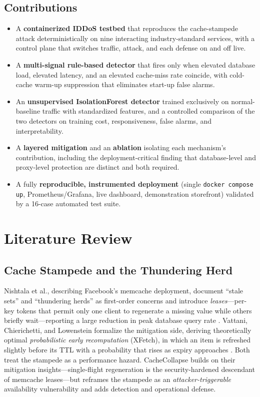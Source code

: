 \documentclass[conference]{IEEEtran}
\begin{document}
\subsection{Contributions}
\begin{itemize}
\item A \textbf{containerized IDDoS testbed} that reproduces the cache-stampede attack
deterministically on nine interacting industry-standard services, with a control
plane that switches traffic, attack, and each defense on and off live.
\item A \textbf{multi-signal rule-based detector} that fires only when elevated
database load, elevated latency, and an elevated cache-miss rate coincide, with
cold-cache warm-up suppression that eliminates start-up false alarms.
\item An \textbf{unsupervised IsolationForest detector} trained exclusively on
normal-baseline traffic with standardized features, and a controlled comparison of
the two detectors on training cost, responsiveness, false alarms, and
interpretability.
\item A \textbf{layered mitigation} and an \textbf{ablation} isolating each
mechanism's contribution, including the deployment-critical finding that
database-level and proxy-level protection are distinct and both required.
\item A fully \textbf{reproducible, instrumented deployment} (single
\texttt{docker compose up}, Prometheus/Grafana, live dashboard, demonstration
storefront) validated by a 16-case automated test suite.
\end{itemize}

\section{Literature Review}
\subsection{Cache Stampede and the Thundering Herd}
Nishtala et al., describing Facebook's memcache deployment, document ``stale sets''
and ``thundering herds'' as first-order concerns and introduce \emph{leases}---per-key
tokens that permit only one client to regenerate a missing value while others briefly
wait---reporting a large reduction in peak database query rate \cite{nishtala2013}.
Vattani, Chierichetti, and Lowenstein formalize the mitigation side, deriving
theoretically optimal \emph{probabilistic early recomputation} (XFetch), in which an
item is refreshed slightly before its TTL with a probability that rises as expiry
approaches \cite{vattani2015}. Both treat the stampede as a performance hazard.
CacheCollapse builds on their mitigation insights---single-flight regeneration is the
security-hardened descendant of memcache leases---but reframes the stampede as an
\emph{attacker-triggerable} availability vulnerability and adds detection and
operational defense.
\end{document}
